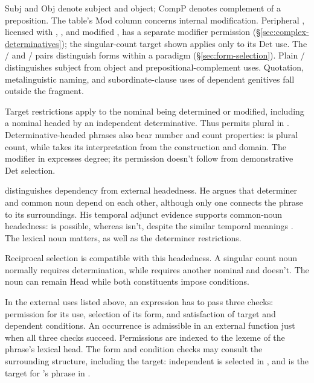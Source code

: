 \documentclass[12pt]{article}
\begin{document}
Subj and Obj denote subject and object; CompP denotes complement of a preposition. The table's Mod column concerns internal modification. Peripheral , licensed with , , and modified , has a separate modifier permission (§\ref{sec:complex-determinatives}); the singular-count target shown applies only to its Det use. The / and / pairs distinguish forms within a paradigm (§\ref{sec:form-selection}). Plain / distinguishes subject from object and prepositional-complement uses. Quotation, metalinguistic naming, and subordinate-clause uses of dependent genitives fall outside the fragment.

Target restrictions apply to the nominal being determined or modified, including a nominal headed by an independent determinative. Thus  permits plural  in . Determinative-headed phrases also bear number and count properties:  is plural count, while  takes its interpretation from the construction and domain. The modifier  in  expresses degree; its permission doesn't follow from demonstrative Det selection.

\textcite[7--8]{hudson2004determiners} distinguishes dependency from external headedness. He argues that determiner and common noun depend on each other, although only one connects the phrase to its surroundings. His temporal adjunct evidence supports common-noun headedness:  is possible, whereas  isn't, despite the similar temporal meanings \citep[10--12]{hudson2004determiners}. The lexical noun matters, as well as the determiner restrictions.

Reciprocal selection is compatible with this headedness. A singular count noun normally requires determination, while  requires another nominal and  doesn't. The noun can remain Head while both constituents impose conditions.

In the external uses listed above, an expression has to pass three checks: permission for its use, selection of its form, and satisfaction of target and dependent conditions. An occurrence is admissible in an external function just when all three checks succeed. Permissions are indexed to the lexeme of the phrase's lexical head. The form and condition checks may consult the surrounding structure, including the target: independent  is selected in , and  is the target for 's phrase in .
\end{document}
